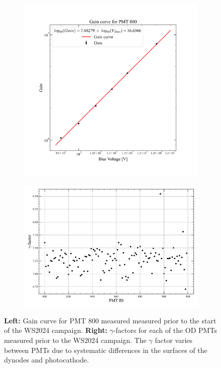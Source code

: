 \begin{figure}
     \begin{subfigure}[b]{0.4\textwidth}
         \centering
         \includegraphics[width=\textwidth]{figures/ODCommissioning/PMT800_GainCurve.png}
         \caption{}
         \label{fig:ODCommissioning/PMT800_gainCurve}
     \end{subfigure}
     \hfill
     \begin{subfigure}[b]{0.59\textwidth}
         \centering
         \includegraphics[width=\textwidth]{figures/ODCommissioning/gammaFactorScatterPlot.pdf}
         \caption{}
         \label{fig:ODCommissioning/gammaFactors}
     \end{subfigure}
        \caption{\textbf{Left:} Gain curve for PMT 800 measured measured prior to the start of the WS2024 campaign. \textbf{Right:} $\gamma$-factors for each of the OD PMTs measured prior to the WS2024 campaign. The $\gamma$ factor varies between PMTs due to systematic differences in the surfaces of the dynodes and photocathode.}
        \label{fig:ODCommissioning/gainCurve}
\end{figure}

